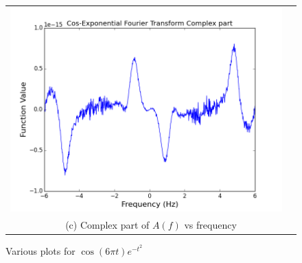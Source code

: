 \documentclass[11pt]{article}
\begin{document}
\begin{figure}[ht]
\begin{tabular}{cc}
\includegraphics[scale=.4]{cos_fourComp.png}\\
\multicolumn{2}{c}{(c) Complex part of $A(f)$ vs frequency} \\[6pt]
\end{tabular}
\caption{Various plots for $\cos (6\pi t) e^{-t^2} $}
\end{figure}
\end{document}
